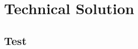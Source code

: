 \documentclass[./project-report/src/latex/project-report.tex]{subfiles}
\begin{document}
\maketitle

\section{Technical Solution}

\subsection{Test}

\inputminted[firstline=0,lastline=5]{python}{./school_project/__main__.py}
\end{document}
